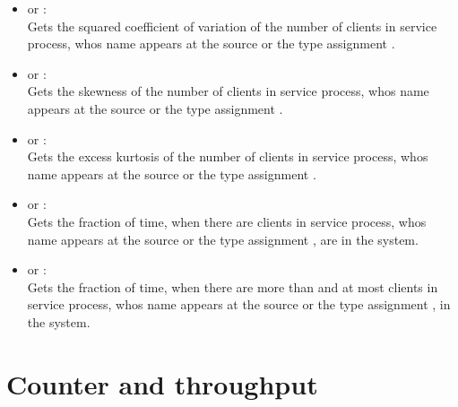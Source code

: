 \begin{itemize}
\item
{} or :\\
Gets the squared coefficient of variation of the number of clients in service process, whos name appears at the source or the type assignment .

\item
{} or :\\
Gets the skewness of the number of clients in service process, whos name appears at the source or the type assignment .

\item
{} or :\\
Gets the excess kurtosis of the number of clients in service process, whos name appears at the source or the type assignment .

\item
{} or :\\
Gets the fraction of time, when there are  clients in service process, whos name appears at the source or the type assignment , are in the system.

\item
{} or :\\
Gets the fraction of time, when there are more than  and at most  clients in service process, whos name appears at the source or the type assignment , in the system.

\end{itemize}





\section{Counter and throughput}

